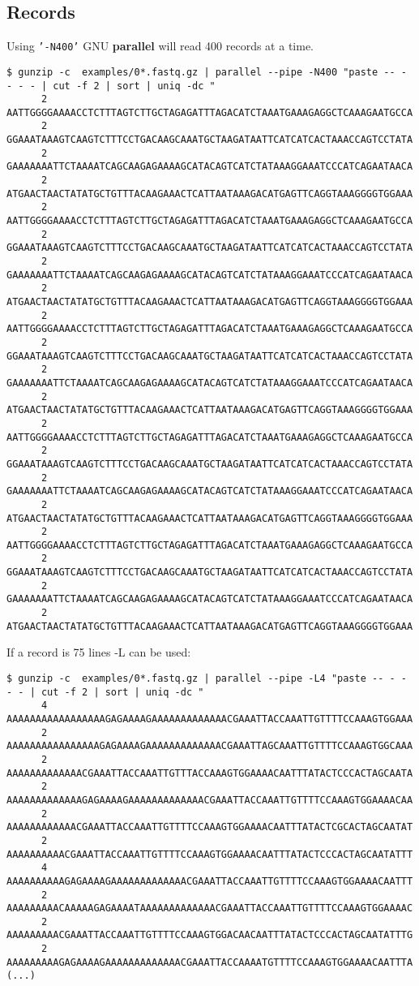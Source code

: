 \documentclass{article}
\newcommand{\cmdoption}[1]{\texttt{'#1'}}
\def\prl{\textbf{parallel}}
\begin{document}
\subsection{Records}
Using \cmdoption{-N400} GNU \prl{} will read 400 records at a time.\\
\begin{lstlisting}
$ gunzip -c  examples/0*.fastq.gz | parallel --pipe -N400 "paste -- - - - - | cut -f 2 | sort | uniq -dc " 
      2 AATTGGGGAAAACCTCTTTAGTCTTGCTAGAGATTTAGACATCTAAATGAAAGAGGCTCAAAGAATGCCA
      2 GGAAATAAAGTCAAGTCTTTCCTGACAAGCAAATGCTAAGATAATTCATCATCACTAAACCAGTCCTATA
      2 GAAAAAAATTCTAAAATCAGCAAGAGAAAAGCATACAGTCATCTATAAAGGAAATCCCATCAGAATAACA
      2 ATGAACTAACTATATGCTGTTTACAAGAAACTCATTAATAAAGACATGAGTTCAGGTAAAGGGGTGGAAA
      2 AATTGGGGAAAACCTCTTTAGTCTTGCTAGAGATTTAGACATCTAAATGAAAGAGGCTCAAAGAATGCCA
      2 GGAAATAAAGTCAAGTCTTTCCTGACAAGCAAATGCTAAGATAATTCATCATCACTAAACCAGTCCTATA
      2 GAAAAAAATTCTAAAATCAGCAAGAGAAAAGCATACAGTCATCTATAAAGGAAATCCCATCAGAATAACA
      2 ATGAACTAACTATATGCTGTTTACAAGAAACTCATTAATAAAGACATGAGTTCAGGTAAAGGGGTGGAAA
      2 AATTGGGGAAAACCTCTTTAGTCTTGCTAGAGATTTAGACATCTAAATGAAAGAGGCTCAAAGAATGCCA
      2 GGAAATAAAGTCAAGTCTTTCCTGACAAGCAAATGCTAAGATAATTCATCATCACTAAACCAGTCCTATA
      2 GAAAAAAATTCTAAAATCAGCAAGAGAAAAGCATACAGTCATCTATAAAGGAAATCCCATCAGAATAACA
      2 ATGAACTAACTATATGCTGTTTACAAGAAACTCATTAATAAAGACATGAGTTCAGGTAAAGGGGTGGAAA
      2 AATTGGGGAAAACCTCTTTAGTCTTGCTAGAGATTTAGACATCTAAATGAAAGAGGCTCAAAGAATGCCA
      2 GGAAATAAAGTCAAGTCTTTCCTGACAAGCAAATGCTAAGATAATTCATCATCACTAAACCAGTCCTATA
      2 GAAAAAAATTCTAAAATCAGCAAGAGAAAAGCATACAGTCATCTATAAAGGAAATCCCATCAGAATAACA
      2 ATGAACTAACTATATGCTGTTTACAAGAAACTCATTAATAAAGACATGAGTTCAGGTAAAGGGGTGGAAA
      2 AATTGGGGAAAACCTCTTTAGTCTTGCTAGAGATTTAGACATCTAAATGAAAGAGGCTCAAAGAATGCCA
      2 GGAAATAAAGTCAAGTCTTTCCTGACAAGCAAATGCTAAGATAATTCATCATCACTAAACCAGTCCTATA
      2 GAAAAAAATTCTAAAATCAGCAAGAGAAAAGCATACAGTCATCTATAAAGGAAATCCCATCAGAATAACA
      2 ATGAACTAACTATATGCTGTTTACAAGAAACTCATTAATAAAGACATGAGTTCAGGTAAAGGGGTGGAAA
\end{lstlisting}
If a record is 75 lines -L can be used:
\begin{lstlisting}
$ gunzip -c  examples/0*.fastq.gz | parallel --pipe -L4 "paste -- - - - - | cut -f 2 | sort | uniq -dc "
      4 AAAAAAAAAAAAAAAAAGAGAAAAGAAAAAAAAAAAAACGAAATTACCAAATTGTTTTCCAAAGTGGAAA
      2 AAAAAAAAAAAAAAAAGAGAAAAGAAAAAAAAAAAAACGAAATTAGCAAATTGTTTTCCAAAGTGGCAAA
      2 AAAAAAAAAAAAACGAAATTACCAAATTGTTTACCAAAGTGGAAAACAATTTATACTCCCACTAGCAATA
      2 AAAAAAAAAAAAAGAGAAAAGAAAAAAAAAAAAACGAAATTACCAAATTGTTTTCCAAAGTGGAAAACAA
      2 AAAAAAAAAAAACGAAATTACCAAATTGTTTTCCAAAGTGGAAAACAATTTATACTCGCACTAGCAATAT
      2 AAAAAAAAAACGAAATTACCAAATTGTTTTCCAAAGTGGAAAACAATTTATACTCCCACTAGCAATATTT
      4 AAAAAAAAAAGAGAAAAGAAAAAAAAAAAAACGAAATTACCAAATTGTTTTCCAAAGTGGAAAACAATTT
      2 AAAAAAAAACAAAAAGAGAAAATAAAAAAAAAAAAACGAAATTACCAAATTGTTTTCCAAAGTGGAAAAC
      2 AAAAAAAAACGAAATTACCAAATTGTTTTCCAAAGTGGACAACAATTTATACTCCCACTAGCAATATTTG
      2 AAAAAAAAAGAGAAAAGAAAAAAAAAAAAACGAAATTACCAAAATGTTTTCCAAAGTGGAAAACAATTTA
(...)
\end{lstlisting}
\end{document}
